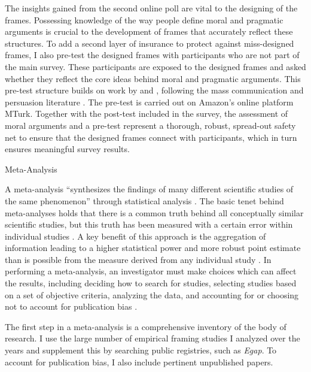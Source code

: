 \documentclass[12pt,]{article}
\makeatletter
\renewcommand\subsubsection{\@startsection{subsubsection}{3}{\z@}
                                     {-3.25ex\@plus -1ex \@minus -.2ex}
                                     {1.5ex \@plus .2ex}
                                     {\normalsize\itshape}} %
\makeatother
\begin{document}
The insights gained from the second online poll are vital to the
designing of the frames. Possessing knowledge of the way people define
moral and pragmatic arguments is crucial to the development of frames
that accurately reflect these structures. To add a second layer of
insurance to protect against miss-designed frames, I also pre-test the
designed frames with participants who are not part of the main survey.
These participants are exposed to the designed frames and asked whether
they reflect the core ideas behind moral and pragmatic arguments. This
pre-test structure builds on work by \citet{slothuus_political_2010} and
\citet{chong_framing_2007}, following the mass communication and
persuasion literature \citep{okeefe_2002_persuasion}. The pre-test is
carried out on Amazon's online platform MTurk. Together with the
post-test included in the survey, the assessment of moral arguments and
a pre-test represent a thorough, robust, spread-out safety net to ensure
that the designed frames connect with participants, which in turn
ensures meaningful survey results.

\subsubsection{Meta-Analysis}\label{framing-data-meta}

A meta-analysis ``synthesizes the findings of many different scientific
studies of the same phenomenon'' through statistical analysis
\citep[p.~190]{groves_survey_2009}. The basic tenet behind meta-analyses
holds that there is a common truth behind all conceptually similar
scientific studies, but this truth has been measured with a certain
error within individual studies
\citep{schmidt_2015_methods, flores_2015_examining, greenland_2008_meta-analysis}.
A key benefit of this approach is the aggregation of information leading
to a higher statistical power and more robust point estimate than is
possible from the measure derived from any individual study
\citep{walker_2008_meta-analysis}. In performing a meta-analysis, an
investigator must make choices which can affect the results, including
deciding how to search for studies, selecting studies based on a set of
objective criteria, analyzing the data, and accounting for or choosing
not to account for publication bias
\citep{brockwell_2011_comparison, paterson_2001_meta-study, kuhberger_1998_influence, boulianne_2009_does}.

The first step in a meta-analysis is a comprehensive inventory of the
body of research. I use the large number of empirical framing studies I
analyzed over the years and supplement this by searching public
registries, such as \textit{Egap}. To account for publication bias, I
also include pertinent unpublished papers.
\end{document}
